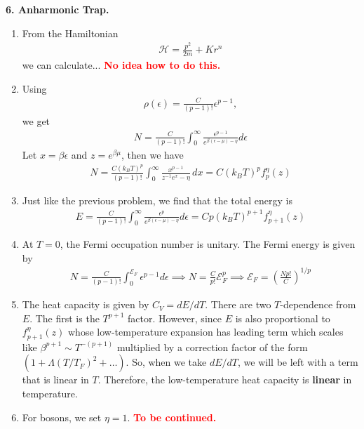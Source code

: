 \documentclass{article}
\theoremstyle{definition}
\newcommand{\ham}{\mathcal{H}}
\newcommand{\be}{\beta}
\newcommand{\f}[2]{\frac{#1}{#2}}
\newcommand{\lp}{\left(}
\newcommand{\rp}{\right)}
\begin{document}
\noindent \textbf{6. Anharmonic Trap.}

\begin{enumerate}[label=(\alph*)]
	\item From the Hamiltonian 
	\begin{align*}
	\ham = \f{p^2}{2m} + K r^n
	\end{align*}
	we can calculate... \textbf{\textcolor{red}{No idea how to do this.}} 
	
	\item Using 
	\begin{align*}
	\rho(\epsilon) = \f{C}{(p-1)!} \epsilon^{p-1},
	\end{align*}
	we get
	\begin{align*}
	N = \f{C}{(p-1)!} \int_0^\infty \f{\epsilon^{p-1}}{e^{\be(\epsilon-\mu) - \eta}} d\epsilon
	\end{align*}
	Let $x = \be \epsilon$ and $z = e^{\be\mu}$, then we have
	\begin{align*}
	N = \f{C (k_BT)^p}{ (p-1)!}\int_0^\infty \f{x^{p-1}}{z^{-1}e^x - \eta}\,dx = \boxed{C(k_BT)^p f_p^\eta(z)}
	\end{align*}
	
	\item Just like the previous problem, we find that the total energy is 
	\begin{align*}
	E = \f{C}{(p-1)!} \int_0^\infty \f{\epsilon^{p}}{e^{\be(\epsilon-\mu) - \eta}} d\epsilon = \boxed{C p (k_B T)^{p+1} f_{p+1}^\eta(z)}
	\end{align*}
	
	\item At $T=0$, the Fermi occupation number is unitary. The Fermi energy is given by 
	\begin{align*}
	N = \f{C}{(p-1)!} \int_0^{\mathcal{E}_F} \epsilon^{p-1} d\epsilon \implies {N =  \f{C}{p!}\mathcal{E}_F^p} \implies  \boxed{\mathcal{E}_F = \lp \f{Np!}{C}\rp^{1/p}}
	\end{align*}
	
	\item The heat capacity is given by $C_V = dE/dT$. There are two $T$-dependence from $E$. The first is the $T^{p+1}$ factor. However, since $E$ is also proportional to $f^\eta_{p+1}(z)$ whose low-temperature expansion has leading term which scales like $\be^{p+1} \sim T^{-(p+1)}$ multiplied by a correction factor of the form $(1+ \Lambda (T/T_F)^2 + \dots )$. So, when we take $dE/dT$, we will be left with a term that is linear in $T$. Therefore, the low-temperature heat capacity is \textbf{linear} in temperature.    
	
	\item For bosons, we set $\eta = 1$. \textbf{\textcolor{red}{To be continued.}}
\end{enumerate}
\end{document}
